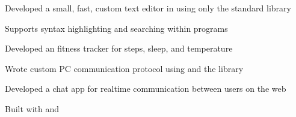 \documentclass[]{deedy-resume-openfont}
\begin{document}
\begin{minipage}[t]{0.66\textwidth}
\descript{}
\begin{tightemize}
\item Developed a small, fast, custom text editor in  using only the standard library
\item Supports syntax highlighting and searching within programs
\end{tightemize}
\sectionsep

\descript{}
\begin{tightemize}
\item Developed an  fitness tracker for steps, sleep, and temperature
\item Wrote custom PC communication protocol using  and the  library
\end{tightemize}
\sectionsep

\descript{}
\begin{tightemize}
\item Developed a chat app for realtime communication between users on the web
\item Built with  and 
\end{tightemize}
\sectionsep




\end{minipage}
\end{document}
